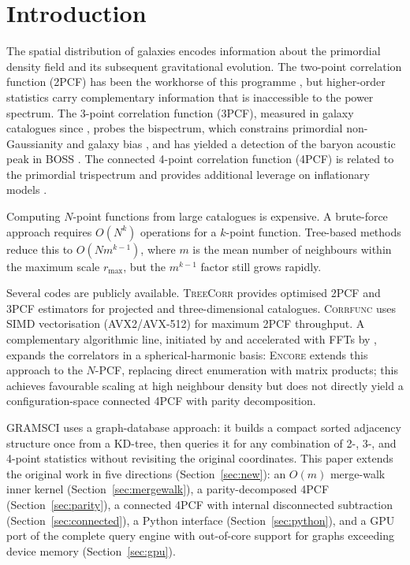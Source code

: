\documentclass[twocolumn]{aastex701}
\newcommand{\rmax}{r_{\mathrm{max}}}
\begin{document}
\section{Introduction}
\label{sec:intro}

The spatial distribution of galaxies encodes information about the
primordial density field and its subsequent gravitational evolution.  The
two-point correlation function (2PCF) has been the workhorse of this
programme \citep[e.g.][]{anderson14}, but higher-order statistics carry
complementary information that is inaccessible to the power spectrum.  The
3-point correlation function (3PCF), measured in galaxy catalogues since
\citet{peebles75}, probes the bispectrum, which constrains
primordial non-Gaussianity and galaxy bias
\citep{sefusatti06,gaztanaga05}, and has yielded a detection of the
baryon acoustic peak in BOSS \citep{slepian17}.  The connected 4-point correlation
function (4PCF) is related to the primordial trispectrum and provides
additional leverage on inflationary models \citep{sefusatti07}.

Computing $N$-point functions from large catalogues is expensive.  A
brute-force approach requires $O(N^k)$ operations for a $k$-point function.
Tree-based methods reduce this to $O(Nm^{k-1})$, where $m$ is the mean
number of neighbours within the maximum scale $\rmax$, but the $m^{k-1}$
factor still grows rapidly.

Several codes are publicly available.  \textsc{TreeCorr} \citep{jarvis04}
provides optimised 2PCF and 3PCF estimators for projected and
three-dimensional catalogues.  \textsc{Corrfunc} \citep{sinha20} uses SIMD
vectorisation (AVX2/AVX-512) for maximum 2PCF throughput.  A complementary algorithmic line, initiated by \citet{slepian15} and
accelerated with FFTs by \citet{slepian16}, expands the correlators in a
spherical-harmonic basis: \textsc{Encore}
\citep{philcox22} extends this approach to the $N$-PCF,
replacing direct enumeration with matrix products; this achieves favourable
scaling at high neighbour density but does not directly yield a
configuration-space connected 4PCF with parity decomposition.

GRAMSCI \citep{sabiu19} uses a graph-database approach: it builds a compact
sorted adjacency structure once from a KD-tree, then queries it for any
combination of 2-, 3-, and 4-point statistics without revisiting the
original coordinates.  This paper extends the original work in five
directions (Section~\ref{sec:new}): an $O(m)$ merge-walk inner kernel
(Section~\ref{sec:mergewalk}), a parity-decomposed 4PCF
(Section~\ref{sec:parity}), a connected 4PCF with internal disconnected
subtraction (Section~\ref{sec:connected}), a Python interface
(Section~\ref{sec:python}), and a GPU port of the complete query engine
with out-of-core support for graphs exceeding device memory
(Section~\ref{sec:gpu}).
\end{document}
